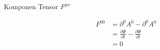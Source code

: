 \label{lamp2}

Komponen Tensor $F^{\mu\nu}$

\begin{equation*}
\begin{split}
F^{00}	&= \partial^0 A^0 - \partial^0 A^0 \\
		&= \frac{\partial \Phi}{\partial t} - \frac{\partial \Phi}{\partial t}\\
		&=0
\end{split}
\end{equation*}

